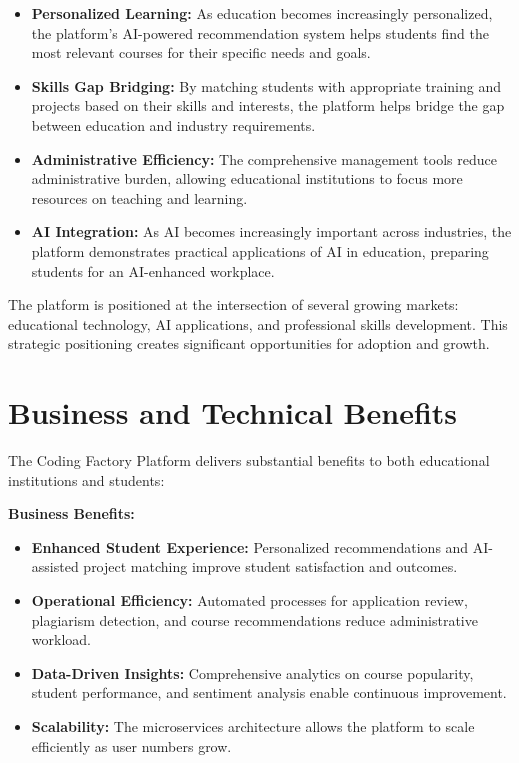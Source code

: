 \documentclass[12pt,a4paper]{report}
\begin{document}
\begin{itemize}
    \item \textbf{Personalized Learning:} As education becomes increasingly personalized, the platform's AI-powered recommendation system helps students find the most relevant courses for their specific needs and goals.

    \item \textbf{Skills Gap Bridging:} By matching students with appropriate training and projects based on their skills and interests, the platform helps bridge the gap between education and industry requirements.

    \item \textbf{Administrative Efficiency:} The comprehensive management tools reduce administrative burden, allowing educational institutions to focus more resources on teaching and learning.

    \item \textbf{AI Integration:} As AI becomes increasingly important across industries, the platform demonstrates practical applications of AI in education, preparing students for an AI-enhanced workplace.
\end{itemize}

The platform is positioned at the intersection of several growing markets: educational technology, AI applications, and professional skills development. This strategic positioning creates significant opportunities for adoption and growth.

\section{Business and Technical Benefits}
The Coding Factory Platform delivers substantial benefits to both educational institutions and students:

\textbf{Business Benefits:}
\begin{itemize}
    \item \textbf{Enhanced Student Experience:} Personalized recommendations and AI-assisted project matching improve student satisfaction and outcomes.

    \item \textbf{Operational Efficiency:} Automated processes for application review, plagiarism detection, and course recommendations reduce administrative workload.

    \item \textbf{Data-Driven Insights:} Comprehensive analytics on course popularity, student performance, and sentiment analysis enable continuous improvement.

    \item \textbf{Scalability:} The microservices architecture allows the platform to scale efficiently as user numbers grow.
\end{itemize}
\end{document}
